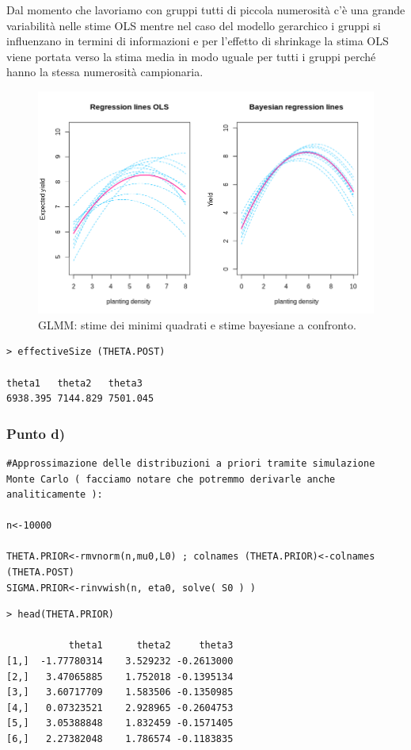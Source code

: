 Dal momento che lavoriamo con gruppi tutti di piccola numerosità c'è una grande 
variabilità nelle stime OLS mentre nel caso del modello gerarchico i gruppi si 
influenzano in termini di informazioni e per l'effetto di shrinkage la stima OLS 
viene portata verso la stima media in modo uguale per tutti i gruppi perché hanno 
la stessa numerosità campionaria.
\begin{figure}
    \centering
    \includegraphics[totalheight=8cm]{img/esercizio11-2-2.png}
    \caption{ GLMM: stime dei minimi quadrati e stime bayesiane a confronto.}
\end{figure}
\newpage
{
\color{red}
\begin{Verbatim}
> effectiveSize (THETA.POST)

theta1   theta2   theta3  
6938.395 7144.829 7501.045 
\end{Verbatim}
}

\subsubsection*{Punto d)}
\begin{lstlisting}[style=R]
#Approssimazione delle distribuzioni a priori tramite simulazione Monte Carlo ( facciamo notare che potremmo derivarle anche analiticamente ):

n<-10000

THETA.PRIOR<-rmvnorm(n,mu0,L0) ; colnames (THETA.PRIOR)<-colnames (THETA.POST)
SIGMA.PRIOR<-rinvwish(n, eta0, solve( S0 ) )
\end{lstlisting}

\newpage
{
\color{red}
\begin{Verbatim}
> head(THETA.PRIOR)

           theta1      theta2     theta3
[1,]  -1.77780314    3.529232 -0.2613000
[2,]   3.47065885    1.752018 -0.1395134
[3,]   3.60717709    1.583506 -0.1350985
[4,]   0.07323521    2.928965 -0.2604753
[5,]   3.05388848    1.832459 -0.1571405
[6,]   2.27382048    1.786574 -0.1183835
\end{Verbatim}
}

